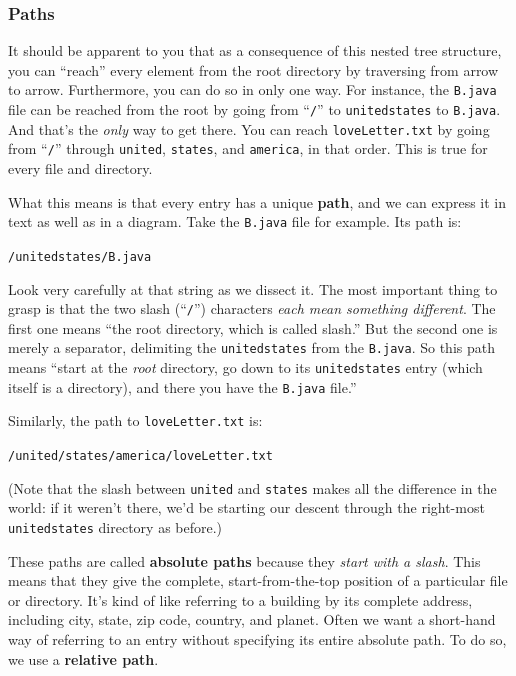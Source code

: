 \subsubsection{Paths}

It should be apparent to you that as a consequence of this nested tree
structure, you can ``reach'' every element from the root directory by
traversing from arrow to arrow. Furthermore, you can do so in only one way.
For instance, the \texttt{B.java} file can be reached from the root by going
from ``\texttt{/}'' to \texttt{unitedstates} to \texttt{B.java}. And that's the
\textit{only} way to get there. You can reach \texttt{loveLetter.txt} by going
from ``\texttt{/}'' through \texttt{united}, \texttt{states}, and
\texttt{america}, in that order. This is true for every file and directory.

What this means is that every entry has a unique \textbf{path}, and we can
express it in text as well as in a diagram. Take the \texttt{B.java} file for
example. Its path is:

\quad\quad \texttt{/unitedstates/B.java}

Look very carefully at that string as we dissect it. The most important thing
to grasp is that the two slash (``\texttt{/}'') characters \textit{each mean
something different}. The first one means ``the root directory, which is called
slash.'' But the second one is merely a separator, delimiting the
\texttt{unitedstates} from the \texttt{B.java}. So this path means
``start at the \textit{root} directory, go down to its \texttt{unitedstates}
entry (which itself is a directory), and there you have the \texttt{B.java}
file.''

Similarly, the path to \texttt{loveLetter.txt} is:

\quad\quad \texttt{/united/states/america/loveLetter.txt}

(Note that the slash between \texttt{united} and \texttt{states} makes all the
difference in the world: if it weren't there, we'd be starting our descent
through the right-most \texttt{unitedstates} directory as before.)

These paths are called \textbf{absolute paths} because they \textit{start with
a slash}. This means that they give the complete, start-from-the-top position
of a particular file or directory. It's kind of like referring to a building
by its complete address, including city, state, zip code, country, and planet.
Often we want a short-hand way of referring to an entry without specifying its
entire absolute path. To do so, we use a \textbf{relative path}.

